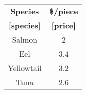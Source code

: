 \begin{center}
\begin{tabular}{|c|c|}
 \hline
 \textbf{Species} & \textbf{\$/piece} \\
  \textbf{[species]} & \textbf{[price]} \\
 \hline
 Salmon & 2 \\
 \hline
 Eel & 3.4 \\
 \hline
  Yellowtail & 3.2  \\
 \hline
 Tuna & 2.6  \\
 \hline
\end{tabular}
\end{center}
